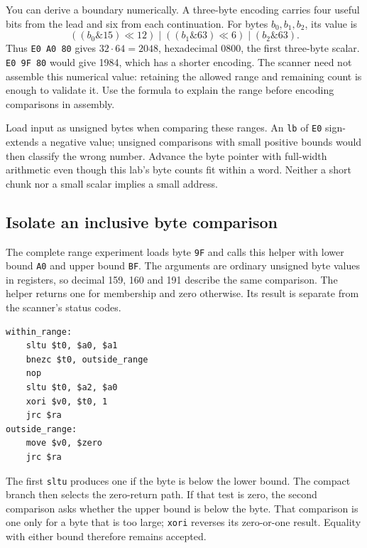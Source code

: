 You can derive a boundary numerically. A three-byte encoding carries four useful
bits from the lead and six from each continuation. For bytes $b_0,b_1,b_2$, its
value is
\[
  ((b_0\mathbin{\&}15)\ll12)
  \mathbin{|}((b_1\mathbin{\&}63)\ll6)
  \mathbin{|}(b_2\mathbin{\&}63).
\]
Thus \texttt{E0 A0 80} gives $32\cdot64=2048$, hexadecimal 0800, the first
three-byte scalar. \texttt{E0 9F 80} would give 1984, which has a shorter encoding.
The scanner need not assemble this numerical value: retaining the allowed range
and remaining count is enough to validate it. Use the formula to explain the
range before encoding comparisons in assembly.

Load input as unsigned bytes when comparing these ranges. An \texttt{lb} of
\texttt{E0} sign-extends a negative value; unsigned comparisons with small positive
bounds would then classify the wrong number. Advance the byte pointer with
full-width arithmetic even though this lab's byte counts fit within a word.
Neither a short chunk nor a small scalar implies a small address.

\subsection*{Isolate an inclusive byte comparison}

The complete range experiment loads byte \texttt{9F} and calls this helper with
lower bound \texttt{A0} and upper bound \texttt{BF}. The arguments are ordinary
unsigned byte values in registers, so decimal 159, 160 and 191 describe the same
comparison. The helper returns one for membership and zero otherwise. Its result
is separate from the scanner's status codes.

\noindent\begin{minipage}{\linewidth}
  \begin{verbatim}
within_range:
    sltu $t0, $a0, $a1
    bnezc $t0, outside_range
    nop
    sltu $t0, $a2, $a0
    xori $v0, $t0, 1
    jrc $ra
outside_range:
    move $v0, $zero
    jrc $ra
\end{verbatim}
\end{minipage}

The first \texttt{sltu} produces one if the byte is below the lower bound. The
compact branch then selects the zero-return path. If that test is zero, the second
comparison asks whether the upper bound is below the byte. That comparison is one
only for a byte that is too large; \texttt{xori} reverses its zero-or-one result.
Equality with either bound therefore remains accepted.

